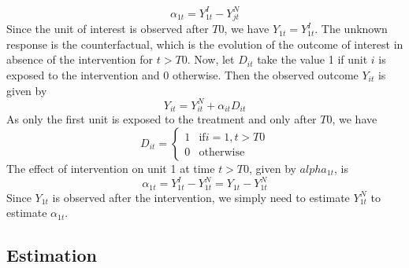 \documentclass[12pt,nobind, a4paper]{reedthesis}
\begin{document}
 \[\alpha_{1t}= Y^{I}_{1t}-Y^{N}_{jt}\]
 Since the unit of interest is observed after \(T0\), we have \(Y_{1t}=Y^{I}_{1t}\). The unknown response is the counterfactual, which is the evolution of the outcome of interest in absence of the intervention for \(t>T0\). Now, let \(D_{it}\) take the value 1 if unit \(i\) is exposed to the intervention and 0 otherwise. Then the observed outcome \(Y_{it}\) is given by
 \begin{equation}
 Y_{it}= Y^{N}_{it} + \alpha_{it} D_{it}
 \label{eq:eq1}
 \end{equation}
 As only the first unit is exposed to the treatment and only after \(T0\), we have
 \begin{equation}
 D_{it} = 
 \begin{cases} 
 1 & \text{if} i=1, t>T0 \\
  0 &\text{otherwise}
 \end{cases}
 \label{eq:eq2}
 \end{equation}
 The effect of intervention on unit 1 at time \(t>T0\), given by \(alpha_{1t}\), is
 \begin{equation}
 \alpha_{1t}= Y^{I}_{1t}-Y^{N}_{1t}= Y_{1t}-Y^{N}_{1t}
 \label{eq:eq3}
 \end{equation}
 Since \(Y_{1t}\) is observed after the intervention, we simply need to estimate \(Y^{N}_{1t}\) to estimate \(\alpha_{1t}\).

 \hypertarget{estimation}{%
 \subsection{Estimation}\label{estimation}}
\end{document}
